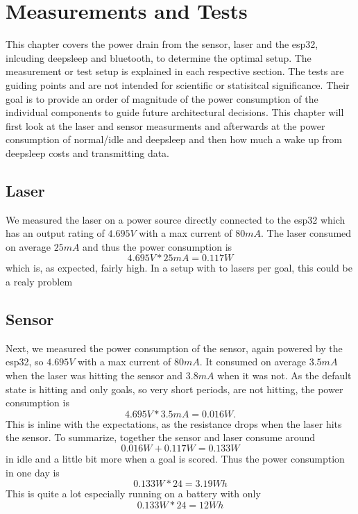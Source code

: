 \section{Measurements and Tests}
This chapter covers the power drain from the sensor, laser and the esp32, inlcuding deepsleep and bluetooth, to determine the optimal setup. The measurement or test setup is explained in each respective section. The tests are guiding points and are not intended for scientific or statisitcal significance. Their goal is to provide an order of magnitude of the power consumption of the individual components to guide future architectural decisions. This chapter will first look at the laser and sensor measurments and afterwards at the power consumption of normal/idle and deepsleep and then how much a wake up from deepsleep costs and transmitting data.


\subsection{Laser}
We measured the laser on a power source directly connected to the esp32 which has an output rating of $4.695V$ with a max current of $80mA$. The laser consumed on average $25mA$ and thus the power consumption is
\begin{equation*}
    4.695V * 25mA = 0.117W
\end{equation*}
which is, as expected, fairly high. In a setup with to lasers per goal, this could be a realy problem


\subsection{Sensor}
Next, we measured the power consumption of the sensor, again powered by the esp32, so $4.695V$ with a max current of $80mA$. It consumed on average $3.5mA$ when the laser was hitting the sensor and $3.8mA$ when it was not. As the default state is hitting and only goals, so very short periods, are not hitting, the power consumption is
  \begin{equation*}
      4.695V * 3.5mA = 0.016W.
    \end{equation*}
This is inline with the expectations, as the resistance drops when the laser hits the sensor. 
To summarize, together the sensor and laser consume around  
\begin{equation*}
    0.016W + 0.117W = 0.133W
  \end{equation*}
in idle and a little bit more when a goal is scored. Thus the power consumption in one day is
\begin{equation*}
    0.133W * 24 = 3.19Wh
\end{equation*}
This is quite a lot especially running on a battery with only
\begin{equation*}
    0.133W * 24 = 12Wh
\end{equation*}

